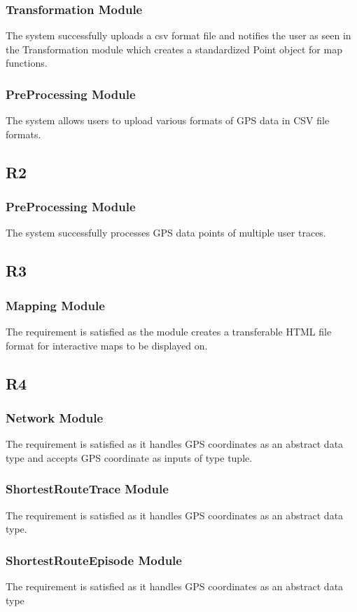 \documentclass[12pt, titlepage]{article}
\begin{document}
\subsubsection{Transformation Module}
The system successfully uploads a csv format file and notifies the user as seen in the Transformation module which creates a standardized Point object for map functions.
\subsubsection{PreProcessing Module}
The system allows users to upload various formats of GPS data in CSV file formats.
\subsection{R2}
\subsubsection{PreProcessing Module}
The system successfully processes GPS data points of multiple user traces.
\subsection{R3}
\subsubsection{Mapping Module}
The requirement is satisfied as the module creates a transferable HTML file format for interactive maps to be displayed on. 
\subsection{R4}
\subsubsection{Network Module}
The requirement is satisfied as it handles GPS coordinates as an abstract data type and accepts GPS coordinate as inputs of type tuple.
\subsubsection{ShortestRouteTrace Module}
The requirement is satisfied as it handles GPS coordinates as an abstract data type.
\subsubsection{ShortestRouteEpisode Module}
The requirement is satisfied as it handles GPS coordinates as an abstract data type
\end{document}
